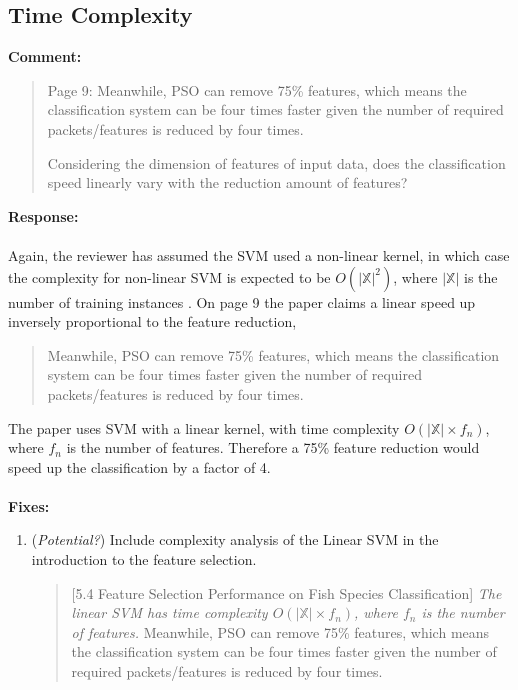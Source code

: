 \documentclass[runningheads]{llncs}
\begin{document}
\subsection{Time Complexity}

\noindent\textbf{Comment:}

\begin{quote}
  Page 9: Meanwhile, PSO can remove 75\% features, which means the classification system can be four times faster given the number of required packets/features is reduced by four times.

  Considering the dimension of features of input data, does the classification speed linearly vary with the reduction amount of features?
\end{quote}

\noindent\textbf{Response:}
\\\\
Again, the reviewer has assumed the SVM used a non-linear kernel, in which case the complexity for non-linear SVM is expected to be $O(|\mathbb{X}|^2)$, where $|\mathbb{X}|$ is the number of training instances \cite{chang2011libsvm}. On page 9 the paper claims a linear speed up inversely proportional to the feature reduction, 

\begin{quote}
  Meanwhile, PSO can remove 75\% features, which means the classification system can be four times faster given the number of required packets/features is reduced by four times. 
\end{quote}

The paper uses SVM with a linear kernel, with time complexity $O(|\mathbb{X}| \times f_n)$, where $f_n$ is the number of features. Therefore a 75\% feature reduction would speed up the classification by a factor of 4. 
\\\\
\noindent\textbf{Fixes:}

\begin{enumerate}
  \item (\emph{Potential?}) Include complexity analysis of the Linear SVM in the introduction to the feature selection. 
  \begin{quote}
    [5.4 Feature Selection Performance on Fish Species Classification]
    \emph{The linear SVM has time complexity $O(|\mathbb{X}| \times f_n)$, where $f_n$ is the number of features.}
    Meanwhile, PSO can remove 75\% features, which means the classification system can be four times faster given the number of required packets/features is reduced by four times. 
  \end{quote}
\end{enumerate}


% 

\end{document}
